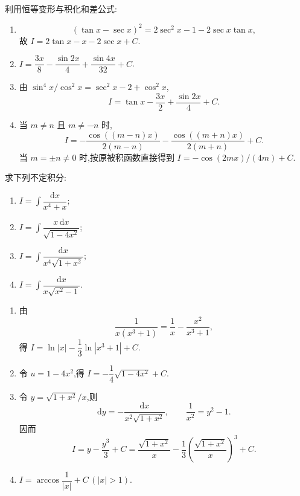\begin{solution}
    利用恒等变形与积化和差公式:
    \begin{enumerate}
        \item
              \[
                  (\tan x-\sec x)^2=2\sec^2x-1-2\sec x\tan x,
              \]
              故 $I=2\tan x-x-2\sec x+C$.
        \item $\displaystyle I=\dfrac{3x}{8}-\dfrac{\sin2x}{4}+\dfrac{\sin4x}{32}+C$.
        \item 由 $\sin^4x/\cos^2x=\sec^2x-2+\cos^2x$,
              \[
                  I=\tan x-\dfrac{3x}{2}+\dfrac{\sin2x}{4}+C.
              \]
        \item 当 $m\neq n$ 且 $m\neq-n$ 时,
              \[
                  I=-\dfrac{\cos((m-n)x)}{2(m-n)}
                  -\dfrac{\cos((m+n)x)}{2(m+n)}+C.
              \]
              当 $m=\pm n\neq0$ 时,按原被积函数直接得到
              $I=-\cos(2mx)/(4m)+C$.
    \end{enumerate}
\end{solution}

\begin{example}
    求下列不定积分:
    \begin{enumerate}
        \item $\displaystyle I=\int\dfrac{\mathrm{d}x}{x^4+x}$;
        \item $\displaystyle I=\int\dfrac{x\,\mathrm{d}x}{\sqrt{1-4x^2}}$;
        \item $\displaystyle I=\int\dfrac{\mathrm{d}x}{x^4\sqrt{1+x^2}}$;
        \item $\displaystyle I=\int\dfrac{\mathrm{d}x}{x\sqrt{x^2-1}}$.
    \end{enumerate}
\end{example}
\exampleblank

\begin{solution}
    \leavevmode
    \begin{enumerate}
        \item 由
              \[
                  \dfrac{1}{x(x^3+1)}=\dfrac{1}{x}-\dfrac{x^2}{x^3+1},
              \]
              得 $\displaystyle I=\ln|x|-\dfrac{1}{3}\ln|x^3+1|+C$.
        \item 令 $u=1-4x^2$,得 $\displaystyle I=-\dfrac{1}{4}\sqrt{1-4x^2}+C$.
        \item 令 $y=\sqrt{1+x^2}/x$,则
              \[
                  \mathrm{d}y=-\dfrac{\mathrm{d}x}{x^2\sqrt{1+x^2}},
                  \qquad
                  \dfrac{1}{x^2}=y^2-1.
              \]
              因而
              \[
                  I=y-\dfrac{y^3}{3}+C
                  =\dfrac{\sqrt{1+x^2}}{x}
                  -\dfrac{1}{3}\left(\dfrac{\sqrt{1+x^2}}{x}\right)^3+C.
              \]
        \item $\displaystyle I=\arccos\dfrac{1}{|x|}+C\,(|x|>1)$.
    \end{enumerate}
\end{solution}

